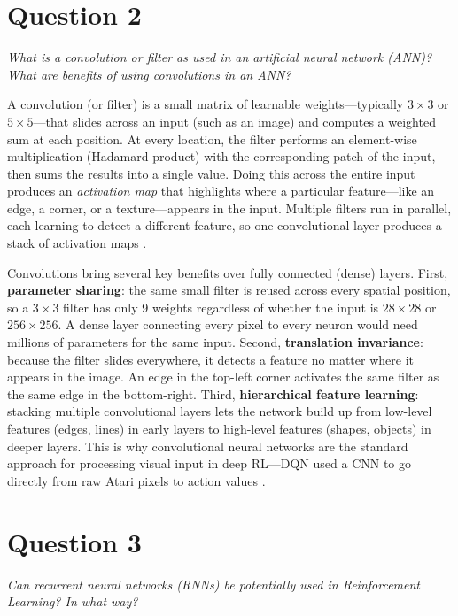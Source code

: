 \documentclass[letterpaper]{article}
\begin{document}
\section*{Question 2}
\textit{What is a convolution or filter as used in an artificial neural network (ANN)? What are benefits of using convolutions in an ANN?}

\vspace{0.5em}

A convolution (or filter) is a small matrix of learnable weights---typically $3 \times 3$ or $5 \times 5$---that slides across an input (such as an image) and computes a weighted sum at each position. At every location, the filter performs an element-wise multiplication (Hadamard product) with the corresponding patch of the input, then sums the results into a single value. Doing this across the entire input produces an \textit{activation map} that highlights where a particular feature---like an edge, a corner, or a texture---appears in the input. Multiple filters run in parallel, each learning to detect a different feature, so one convolutional layer produces a stack of activation maps \citep{goodfellow2016deep}.

Convolutions bring several key benefits over fully connected (dense) layers. First, \textbf{parameter sharing}: the same small filter is reused across every spatial position, so a $3 \times 3$ filter has only 9 weights regardless of whether the input is $28 \times 28$ or $256 \times 256$. A dense layer connecting every pixel to every neuron would need millions of parameters for the same input. Second, \textbf{translation invariance}: because the filter slides everywhere, it detects a feature no matter where it appears in the image. An edge in the top-left corner activates the same filter as the same edge in the bottom-right. Third, \textbf{hierarchical feature learning}: stacking multiple convolutional layers lets the network build up from low-level features (edges, lines) in early layers to high-level features (shapes, objects) in deeper layers. This is why convolutional neural networks are the standard approach for processing visual input in deep RL---DQN used a CNN to go directly from raw Atari pixels to action values \citep{mnih2015human}.

\section*{Question 3}
\textit{Can recurrent neural networks (RNNs) be potentially used in Reinforcement Learning? In what way?}
\end{document}
